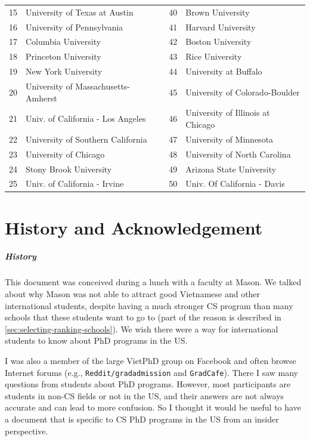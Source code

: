 \documentclass[oneside,11pt,dvipsnames]{book}
\newcommand{\red}[1]{{\color{red}{#1}}}
\begin{document}
\begin{table}[h]
\begin{tabular}{rl|rl}
    15 & University of Texas at Austin &40& Brown University \\
    16 & University of Pennsylvania &41 & Harvard University \\
    17 & Columbia University\red{$^*$} &42 & Boston University  \\
    18 & Princeton University\red{$^*$}  & 43& Rice University\\
    19 & New York University  & 44&  University at Buffalo\red{$^*$}\\
    20 &  University of Massachusetts-Amherst\red{$^*$} &45& University of Colorado-Boulder \\
    21 & Univ. of California - Los Angeles &46& University of Illinois at Chicago  \\
    22 & University of Southern California &47& University of Minnesota \\
    23 & University of Chicago &48& University of North Carolina\red{$^*$} \\
    24 & Stony Brook University\red{$^*$} &49& Arizona State University\red{$^*$} \\
    25 &  Univ. of California - Irvine&50& Univ. Of California - Davis \\
    \bottomrule
  \end{tabular}
\end{table}



\chapter*{History and Acknowledgement}\label{sec:ack}

\paragraph{History} This document was conceived during a lunch with a faculty at Mason.  We talked about why Mason was not able to attract good Vietnamese and other international students, despite having a much stronger CS program than many schools that these students want to go to (part of the reason is described in \autoref{sec:selecting-ranking-schools}). We wish there were a way for international students to know about PhD programs in the US.

I was also a member of the large VietPhD group on Facebook and often browse Internet forums (e.g., \texttt{Reddit/gradadmission} and \texttt{GradCafe}). There I saw many questions from students about PhD programs.  However, most participants are students in non-CS fields or not in the US, and their answers are not always accurate and can lead to more confusion. So I thought it would be useful to have a document that is specific to CS PhD programs in the US from an insider perspective.
\end{document}
